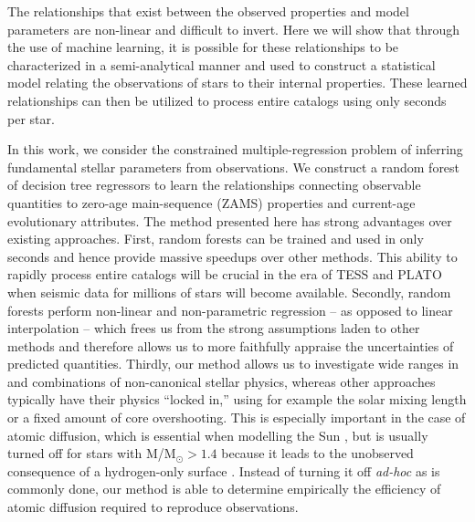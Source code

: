 \documentclass[manuscript]{aastex}
\begin{document}
The relationships that exist between the observed properties and model parameters are non-linear and difficult to invert. Here we will show that through the use of machine learning, it is possible for these relationships to be characterized in a semi-analytical manner and used to construct a statistical model relating the observations of stars to their internal properties. These learned relationships can then be utilized to process entire catalogs using only seconds per star. 

In this work, we consider the constrained multiple-regression problem of inferring fundamental stellar parameters from observations. We construct a random forest of decision tree regressors to learn the relationships connecting observable quantities to zero-age main-sequence (ZAMS) properties and current-age evolutionary attributes. The method presented here has strong advantages over existing approaches. First, random forests can be trained and used in only seconds and hence provide massive speedups over other methods. This ability to rapidly process entire catalogs will be crucial in the era of TESS \citep{2015JATIS...1a4003R} and PLATO \citep{2014ExA....38..249R} when seismic data for millions of stars will become available. Secondly, random forests perform non-linear and non-parametric regression -- as opposed to linear interpolation -- which frees us from the strong assumptions laden to other methods and therefore allows us to more faithfully appraise the uncertainties of predicted quantities. %
Thirdly, our method allows us to investigate wide ranges in and combinations of non-canonical stellar physics, whereas other approaches typically have their physics ``locked in,'' using for example the solar mixing length or a fixed amount of core overshooting. This is especially important in the case of atomic diffusion, which is essential when modelling the Sun \citep{1994MNRAS.269.1137B}, but is usually turned off for stars with M/M$_\odot > 1.4$ because it leads to the unobserved consequence of a hydrogen-only surface \citep{2002A&A...390..611M}. Instead of turning it off \emph{ad-hoc} as is commonly done, our method is able to determine empirically the efficiency of atomic diffusion required to reproduce observations. %
\end{document}
